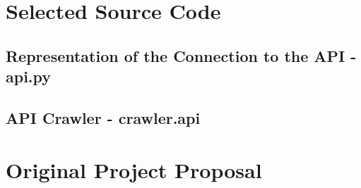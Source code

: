 \documentclass[a4paper,12pt,twoside,notitlepage]{report}
\begin{document}



\cleardoublepage


\lstset{numbers=left,numberstyle=\footnotesize\texttt}

\appendix
\chapter{Selected Source Code}

\section{Representation of the Connection to the API - api.py}
\label{app:api-code}



\clearpage

\section{API Crawler - crawler.api}
\label{app:crawler-code}



\clearpage

\chapter{Original Project Proposal}


\cleardoublepage
\end{document}
